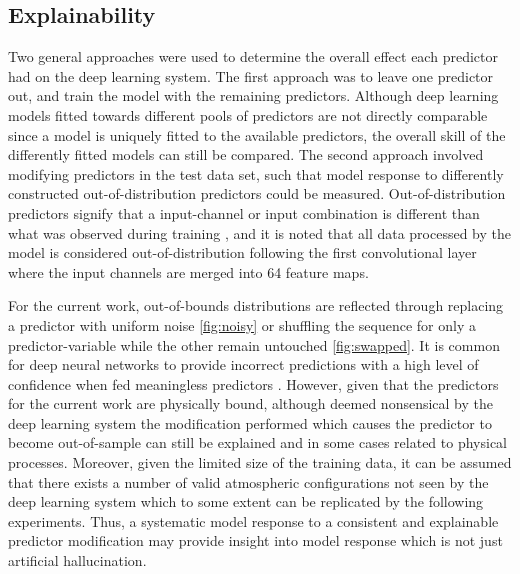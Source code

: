 \documentclass[../main/thesis]{subfiles}
\begin{document}
\subsection{Explainability}
\label{sec:discuss_explain}
Two general approaches were used to determine the overall effect each predictor had on the deep learning system. The first approach was to leave one predictor out, and train the model with the remaining predictors. Although deep learning models fitted towards different pools of predictors are not directly comparable since a model is uniquely fitted to the available predictors, the overall skill of the differently fitted models can still be compared. The second approach involved modifying predictors in the test data set, such that model response to differently constructed out-of-distribution predictors could be measured. Out-of-distribution predictors signify that a input-channel or input combination is different than what was observed during training \citep{DeVries2018}, and it is noted that all data processed by the model is considered out-of-distribution following the first convolutional layer where the input channels are merged into 64 feature maps. 

For the current work, out-of-bounds distributions are reflected through replacing a predictor with uniform noise \ref{fig:noisy} or shuffling the sequence for only a predictor-variable while the other remain untouched \ref{fig:swapped}. It is common for deep neural networks to provide incorrect predictions with a high level of confidence when fed meaningless predictors \citep{DeVries2018}. However, given that the predictors for the current work are physically bound, although deemed nonsensical by the deep learning system the modification performed which causes the predictor to become out-of-sample can still be explained and in some cases related to physical processes. Moreover, given the limited size of the training data, it can be assumed that there exists a number of valid atmospheric configurations not seen by the deep learning system which to some extent can be replicated by the following experiments. Thus, a systematic model response to a consistent and explainable predictor modification may provide insight into model response which is not just artificial hallucination.
\end{document}
